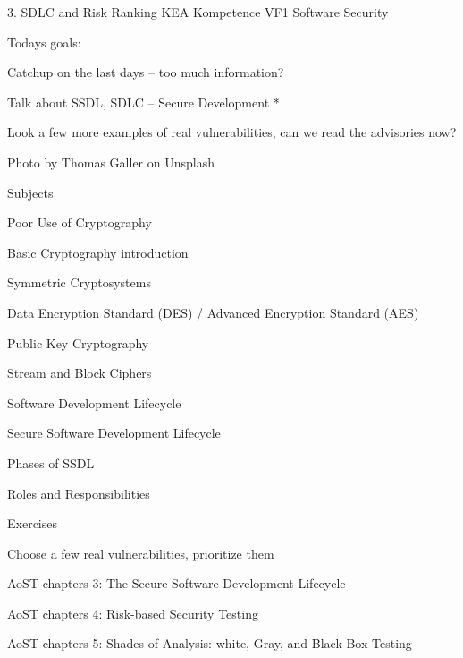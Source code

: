 \documentclass[Screen16to9,17pt]{foils}
\begin{document}
\mytitlepage
{3. SDLC and Risk Ranking}
{KEA Kompetence VF1 Software Security}



Todays goals:
\begin{list2}
\item Catchup on the last days -- too much information?
\item Talk about SSDL, SDLC -- Secure Development *
\item Look a few more examples of real vulnerabilities, can we read the advisories now?
\end{list2}

  Photo by Thomas Galler on Unsplash




\begin{list1}
\item Subjects
\begin{list2}
\item Poor Use of Cryptography
\item Basic Cryptography introduction
\item Symmetric Cryptosystems
\item Data Encryption Standard (DES) / Advanced Encryption Standard (AES)
\item Public Key Cryptography
\item Stream and Block Ciphers
\item Software Development Lifecycle
\item Secure Software Development Lifecycle
\item Phases of SSDL
\item Roles and Responsibilities
\end{list2}
\item Exercises
\begin{list2}
\item Choose a few real vulnerabilities, prioritize them
\end{list2}
\end{list1}



\begin{list1}
\item AoST chapters 3: The Secure Software Development Lifecycle
\item AoST chapters 4: Risk-based Security Testing
\item AoST chapters 5: Shades of Analysis: white, Gray, and Black Box Testing
\end{list1}
\end{document}
